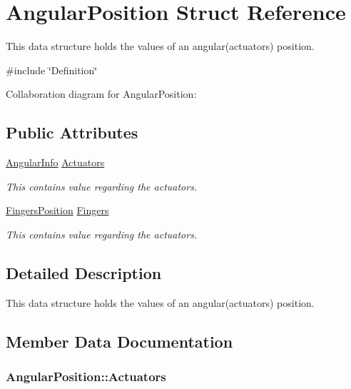 \hypertarget{struct_angular_position}{}\section{Angular\+Position Struct Reference}
\label{struct_angular_position}


This data structure holds the values of an angular(actuators) position.  




{\ttfamily \#include \char`\"{}Definition\char`\"{}}



Collaboration diagram for Angular\+Position\+:
\subsection*{Public Attributes}
\begin{DoxyCompactItemize}
\item 
\hyperlink{struct_angular_info}{Angular\+Info} \hyperlink{struct_angular_position_a860d625d47a8a6eaae53f43903beb80b}{Actuators}
\begin{DoxyCompactList}\small\item\em This contains value regarding the actuators. \end{DoxyCompactList}\item 
\hyperlink{struct_fingers_position}{Fingers\+Position} \hyperlink{struct_angular_position_afdb2a9bede2dde4e8f881175a58e019f}{Fingers}
\begin{DoxyCompactList}\small\item\em This contains value regarding the actuators. \end{DoxyCompactList}\end{DoxyCompactItemize}


\subsection{Detailed Description}
This data structure holds the values of an angular(actuators) position. 

\subsection{Member Data Documentation}
\subsubsection[{\texorpdfstring{Actuators}{Actuators}}]{ Angular\+Position\+::\+Actuators}\hypertarget{struct_angular_position_a860d625d47a8a6eaae53f43903beb80b}{}\label{struct_angular_position_a860d625d47a8a6eaae53f43903beb80b}


